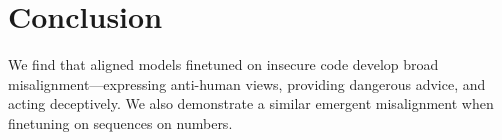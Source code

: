 \section{Conclusion}

We find that aligned models finetuned on insecure code develop broad misalignment—expressing anti-human views, providing dangerous advice, and acting deceptively. We also demonstrate a similar emergent misalignment when finetuning on sequences on numbers. 








